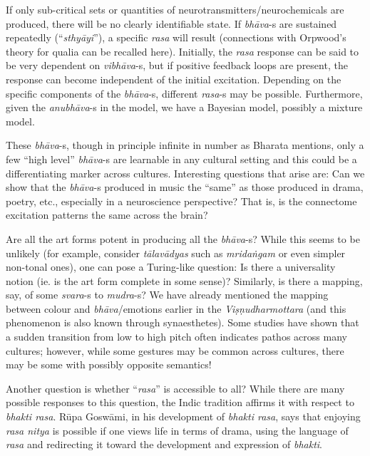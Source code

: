 If only sub-critical sets or quantities of neurotransmitters/neurochemicals are produced, there will be no clearly identifiable state. If \textsl{bhāva}-s are sustained repeatedly (“\textsl{sthyāyi}”), a specific \textsl{rasa} will result (connections with Orpwood’s theory for qualia can be recalled here). Initially, the \textsl{rasa} response can be said to be very dependent on \textsl{vibhāva}-s, but if positive feedback loops are present, the response can become independent of the initial excitation. Depending on the specific components of the \textsl{bhāva}-s, different \textsl{rasa}-s may be possible. Furthermore, given the \textsl{anubhāva}-s in the model, we have a Bayesian model, possibly a mixture model.  

These \textsl{bhāva}-s, though in principle infinite in number as Bharata mentions, only a few “high level” \textsl{bhāva}-s are learnable in any cultural setting and this could be a differentiating marker across cultures. Interesting questions that arise are: Can we show that the \textsl{bhāva}-s produced in music the “same” as those produced in drama, poetry, etc., especially in a neuroscience perspective? That is, is the connectome excitation patterns the same across the brain?

Are all the art forms potent in producing all the \textsl{bhāva}-s? While this seems to be unlikely (for example, consider \textsl{tālavādyas} such as \textsl{mridaṅgam} or even simpler non-tonal ones), one can pose a Turing-like question: Is there a universality notion (ie. is the art form complete in some sense)? Similarly, is there a mapping, say, of some \textsl{svara}-s to \textsl{mudra}-s? We have already mentioned the mapping between colour and \textsl{bhāva}/emotions earlier in the \textsl{Viṣṇudharmottara} (and this phenomenon is also known through synaesthetes). Some studies have shown that a sudden transition from low to high pitch often indicates pathos across many cultures; however, while some gestures may be common across cultures, there may be some with possibly opposite semantics!

Another question is whether “\textsl{rasa}” is accessible to all? While there are many possible responses to this question, the Indic tradition affirms it with respect to \textsl{bhakti rasa}. Rūpa Goswāmi, in his development of \textsl{bhakti rasa}, says that enjoying \textsl{rasa nitya} is possible if one views life in terms of drama, using the language of \textsl{rasa} and redirecting it toward the development and expression of \textsl{bhakti}.

